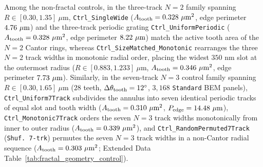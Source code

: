 \documentclass[pdflatex,sn-nature]{sn-jnl}
\DeclareRobustCommand{\roundtwo}[1]{\fpeval{round(#1,2)}}
\DeclareRobustCommand{\roundthree}[1]{\fpeval{round(#1,3)}}
\begin{document}
Among the non-fractal controls, in the three-track $N=2$ family spanning $R \in [0.30, 1.35]\ \mu\text{m}$, \texttt{Ctrl\_SingleWide} ($A_{\rm tooth} = \roundthree{\FractalCtrlSinglewideActiveToothAreaUmtwo}\ \mu\text{m}^2$, edge perimeter $\roundtwo{\FractalCtrlSinglewideEdgePerimeterUm}\ \mu\text{m}$) and the three-track periodic grating \texttt{Ctrl\_UniformPeriodic} ($A_{\rm tooth} = \roundthree{\FractalCtrlUniformperiodicActiveToothAreaUmtwo}\ \mu\text{m}^2$, edge perimeter $\roundtwo{\FractalCtrlUniformperiodicEdgePerimeterUm}\ \mu\text{m}$) match the active tooth area of the $N=2$ Cantor rings, whereas \texttt{Ctrl\_SizeMatched\_Monotonic} rearranges the three $N=2$ track widths in monotonic radial order, placing the widest $350\text{ nm}$ slot at the outermost radius ($R \in [0.883, 1.233]\ \mu\text{m}$, $A_{\rm tooth} = \roundthree{\FractalCtrlSizematchedMonotonicActiveToothAreaUmtwo}\ \mu\text{m}^2$, edge perimeter $\roundtwo{\FractalCtrlSizematchedMonotonicEdgePerimeterUm}\ \mu\text{m}$). Similarly, in the seven-track $N=3$ control family spanning $R \in [0.30, 1.65]\ \mu\text{m}$ ($28$ teeth, $\Delta\theta_{\rm tooth} = 12^\circ$, $3{,}168$ \texttt{Standard} BEM panels), \texttt{Ctrl\_Uniform7Track} subdivides the annulus into seven identical periodic tracks of equal slot and tooth width ($A_{\rm tooth} = 0.310\ \mu\text{m}^2$, $P_{\rm edge} = 14.48\ \mu\text{m}$), \texttt{Ctrl\_Monotonic7Track} orders the seven $N=3$ track widths monotonically from inner to outer radius ($A_{\rm tooth} = 0.339\ \mu\text{m}^2$), and \texttt{Ctrl\_RandomPermuted7Track} (\texttt{Shuf.\ 7-trk}) permutes the seven $N=3$ track widths in a non-Cantor radial sequence ($A_{\rm tooth} = 0.303\ \mu\text{m}^2$; Extended Data Table~\ref{tab:fractal_geometry_control}).
\end{document}
